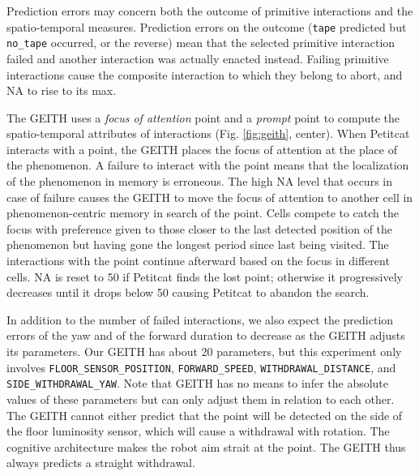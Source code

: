 \documentclass[runningheads]{llncs}
\begin{document}
Prediction errors may concern both the outcome of primitive interactions and the spatio-temporal measures.
Prediction errors on the outcome (\texttt{tape} predicted but \texttt{no\_tape} occurred, or the reverse) mean that the selected primitive interaction failed and another interaction was actually enacted instead. 
Failing primitive interactions cause the composite interaction to which they belong to abort, and NA to rise to its max.

The GEITH uses a \textit{focus of attention} point and a \textit{prompt} point to compute the spatio-temporal attributes of interactions (Fig. \ref{fig:geith}, center). 
When Petitcat interacts with a point, the GEITH places the focus of attention at the place of the phenomenon. 
A failure to interact with the point means that the localization of the phenomenon in memory is erroneous. 
The high NA level that occurs in case of failure causes the GEITH to move the focus of attention to another cell in phenomenon-centric memory in search of the point.
Cells compete to catch the focus with preference given to those closer to the last detected position of the phenomenon but having gone the longest period since last being visited.
The interactions with the point continue afterward based on the focus in different cells. 
NA is reset to 50 if Petitcat finds the lost point; otherwise it progressively decreases until it drops below 50 causing Petitcat to abandon the search. 

In addition to the number of failed interactions, we also expect the prediction errors of the yaw and of the forward duration to decrease as the GEITH adjusts its parameters. 
Our GEITH has about 20 parameters, but this experiment only involves \texttt{FLOOR\_SENSOR\_POSITION}, \texttt{FORWARD\_SPEED}, \texttt{WITHDRAWAL\_DIS\-TANCE}, and \texttt{SIDE\_WITH\-DRA\-WAL\_YAW}.
Note that GEITH has no means to infer the absolute values of these parameters but can only adjust them in relation to each other.
The GEITH cannot either predict that the point will be detected on the side of the floor luminosity sensor, which will cause a withdrawal with rotation. 
The cognitive architecture makes the robot aim strait at the point.
The GEITH thus always predicts a straight withdrawal. 

\end{document}
